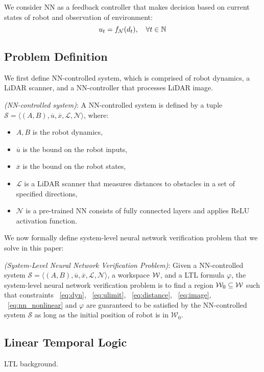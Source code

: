 We consider NN as a feedback controller that makes decision based on current states of robot and observation of environment:
\begin{equation}    
    \label{eq:nn_nonlinear}    
    u_t = f_{\mathcal{N}}(d_t), \quad \forall t \in {\mathbb{N}}
\end{equation}    





\subsection{Problem Definition}
We first define NN-controlled system, which is comprised of robot dynamics, a LiDAR scanner, 
and a NN-controller that processes LiDAR image.

\begin{definition}
    \textit{(NN-controlled system)}: 
    A NN-controlled system is defined by a tuple 
    $\mathcal{S} = \langle (A, B), \overline{u}, \overline{x}, \mathcal{L}, \mathcal{N} \rangle$, where:
    \begin{itemize}
        \item ${A, B}$ is the robot dynamics,
        \item $\overline{u}$ is the bound on the robot inputs,
        \item $\overline{x}$ is the bound on the robot states,
        \item $\mathcal{L}$ is a LiDAR scanner that measures distances to obstacles in a set of specified directions,
        \item $\mathcal{N}$ is a pre-trained NN consists of fully connected layers and applies ReLU activation function.
    \end{itemize}
\end{definition}    


We now formally define system-level neural network verification problem that we solve in this paper:
\begin{definition}
    \textit{(System-Level Neural Network Verification Problem)}: 
    Given a NN-controlled system $\mathcal{S} = \langle (A, B), \overline{u}, \overline{x}, \mathcal{L}, \mathcal{N} \rangle$, 
    a workspace ${\mathcal{W}}$, and a LTL formula $\varphi$, the system-level neural network verification problem is to find 
    a region $\mathcal{W}_0 \subseteq {\mathcal{W}}$ such that 
    constraints ~\eqref{eq:dyn}, ~\eqref{eq:ulimit}, ~\eqref{eq:distance}, ~\eqref{eq:image}, ~\eqref{eq:nn_nonlinear}
    and $\varphi$ are guaranteed to be satisfied by the NN-controlled system $\mathcal{S}$
    as long as the initial position of robot is in $\mathcal{W}_0$.
\end{definition}    


\subsection{Linear Temporal Logic}

{\color{blue} LTL background.}



